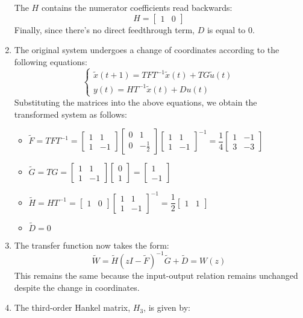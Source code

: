 \begin{enumerate}
        The $H$ contains the numerator coefficients read backwards:
        \[H=\begin{bmatrix} 1 & 0 \end{bmatrix}\]
        Finally, since there's no direct feedthrough term, $D$ is equal to $0$. 
    \item The original system undergoes a change of coordinates according to the following equations:
        \[\begin{cases}
            \tilde{x}(t+1)=TFT^{-1} \tilde{x}(t)+TG\tilde{u}(t) \\
            y(t)=HT^{-1}\tilde{x}(t)+Du(t)
        \end{cases}\]
        Substituting the matrices into the above equations, we obtain the transformed system as follows:
        \begin{itemize}
            \item $\tilde{F}=TFT^{-1}=\begin{bmatrix} 1 & 1 \\ 1 & -1 \end{bmatrix}\begin{bmatrix} 0 & 1 \\ 0 & -\frac{1}{2} \end{bmatrix} \begin{bmatrix} 1 & 1 \\ 1 & -1 \end{bmatrix}^{-1}=\dfrac{1}{4}\begin{bmatrix} 1 & -1 \\ 3 & -3 \end{bmatrix}$
            \item $\tilde{G}=TG=\begin{bmatrix} 1 & 1 \\ 1 & -1 \end{bmatrix}\begin{bmatrix} 0 \\ 1 \end{bmatrix}=\begin{bmatrix} 1 \\ -1 \end{bmatrix}$
            \item $\tilde{H}=HT^{-1}=\begin{bmatrix} 1 & 0 \end{bmatrix}\begin{bmatrix} 1 & 1 \\ 1 & -1 \end{bmatrix}^{-1}=\dfrac{1}{2}\begin{bmatrix} 1 & 1 \end{bmatrix}$
            \item $\tilde{D}=0$
        \end{itemize}
    \item The transfer function now takes the form:
        \[\tilde{W}=\tilde{H}(zI-\tilde{F})^{-1}\tilde{G}+\tilde{D}=W(z)\]
        This remains the same because the input-output relation remains unchanged despite the change in coordinates.
    \item The third-order Hankel matrix, $H_3$, is given by:
    

\end{enumerate}
